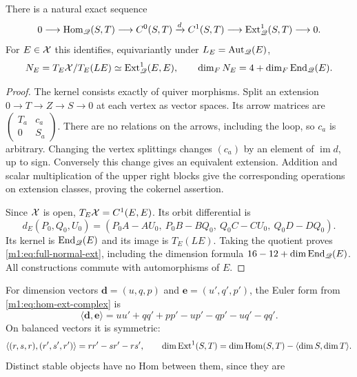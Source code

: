 \begin{lemma}\label{m1:lem:hom-ext}
There is a natural exact sequence
\begin{equation}\label{m1:eq:hom-ext-complex}
 0\longrightarrow\operatorname{Hom}_{\mathscr Q}(S,T)\longrightarrow C^0(S,T)
 \xrightarrow{d}C^1(S,T)\longrightarrow\operatorname{Ext}^1_{\mathscr Q}(S,T)
 \longrightarrow0.
\end{equation}
For $E\in\mathcal X$ this identifies, equivariantly under $L_E=\operatorname{Aut}_{\mathscr Q}(E)$,
\begin{equation}\label{m1:eq:full-normal-ext}
 N_E=T_E\mathcal X/T_E(LE)\simeq\operatorname{Ext}^1_{\mathscr Q}(E,E),
 \qquad\dim_F N_E=4+\dim_F\operatorname{End}_{\mathscr Q}(E).
\end{equation}
\end{lemma}
\begin{proof}
The kernel consists exactly of quiver morphisms. Split an extension
$0\to T\to Z\to S\to0$ at each vertex as vector spaces. Its arrow
matrices are $\left(\begin{smallmatrix}T_a&c_a\\0&S_a\end{smallmatrix}\right)$.
There are no relations on the arrows, including the loop, so $c_a$ is
arbitrary. Changing the vertex splittings changes $(c_a)$ by an element
of $\operatorname{im}d$, up to sign. Conversely this change gives an
equivalent extension. Addition and scalar multiplication of the upper
right blocks give the corresponding operations on extension classes,
proving the cokernel assertion.

Since $\mathcal X$ is open, $T_E\mathcal X=C^1(E,E)$. Its orbit differential is
\begin{equation}\label{m1:eq:orbit-differential}
 d_E(P_0,Q_0,U_0)
 =(P_0A-AU_0,\ P_0B-BQ_0,\ Q_0C-CU_0,\ Q_0D-DQ_0).
\end{equation}
Its kernel is $\operatorname{End}_{\mathscr Q}(E)$ and its image is $T_E(LE)$.
Taking the quotient proves \eqref{m1:eq:full-normal-ext}, including the
dimension formula $16-12+\dim\operatorname{End}_{\mathscr Q}(E)$. All constructions commute
with automorphisms of $E$.
\end{proof}
For dimension vectors $\mathbf d=(u,q,p)$ and
$\mathbf e=(u',q',p')$, the Euler form from
\eqref{m1:eq:hom-ext-complex} is
\[
 \langle\mathbf d,\mathbf e\rangle
 =uu'+qq'+pp'-up'-qp'-uq'-qq'.
\]
On balanced vectors it is symmetric:
\begin{equation}\label{m1:eq:balanced-euler}
 \langle(r,s,r),(r',s',r')\rangle=rr'-sr'-rs',\qquad
 \dim\operatorname{Ext}^1(S,T)=\dim\operatorname{Hom}(S,T)-\langle\dim S,\dim T\rangle.
\end{equation}
Distinct stable objects have no Hom between them, since they are
